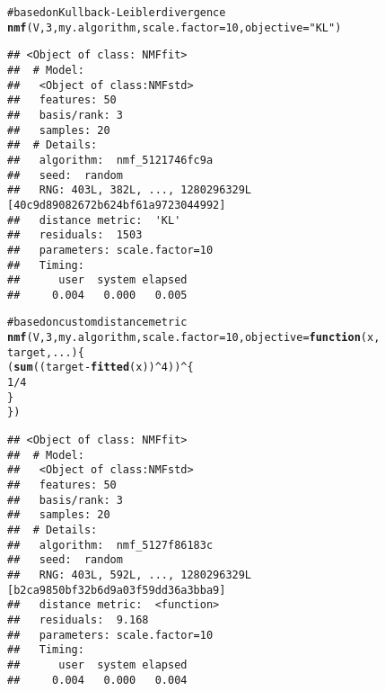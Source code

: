 \documentclass[a4paper]{article}\usepackage{graphicx, color}
\makeatletter
\newcommand{\hlfunctioncall}[1]{\textcolor[rgb]{0.501960784313725,0,0.329411764705882}{\textbf{#1}}}%
\newcommand{\hlstring}[1]{\textcolor[rgb]{0.6,0.6,1}{#1}}%
\newcommand{\hlcomment}[1]{\textcolor[rgb]{0.180392156862745,0.6,0.341176470588235}{#1}}%
\newenvironment{kframe}{%
 \def\at@end@of@kframe{}%
 \ifinner\ifhmode%
  \def\at@end@of@kframe{\end{minipage}}%
  \begin{minipage}{\columnwidth}%
 \fi\fi%
 \def\FrameCommand##1{\hskip\@totalleftmargin \hskip-\fboxsep
 \colorbox{shadecolor}{##1}\hskip-\fboxsep
     \hskip-\linewidth \hskip-\@totalleftmargin \hskip\columnwidth}%
 \MakeFramed {\advance\hsize-\width
   \@totalleftmargin\z@ \linewidth\hsize
   \@setminipage}}%
 {\par\unskip\endMakeFramed%
 \at@end@of@kframe}
\newenvironment{knitrout}{}{} %
\makeatother
\begin{document}
\begin{knitrout}
\color{fgcolor}\begin{kframe}
\begin{alltt}
\hlcomment{# based on Kullback-Leibler divergence}
\hlfunctioncall{nmf}(V, 3, my.algorithm, scale.factor = 10, objective = \hlstring{"KL"})
\end{alltt}
\begin{verbatim}
## <Object of class: NMFfit>
##  # Model:
##   <Object of class:NMFstd>
##   features: 50 
##   basis/rank: 3 
##   samples: 20 
##  # Details:
##   algorithm:  nmf_5121746fc9a 
##   seed:  random 
##   RNG: 403L, 382L, ..., 1280296329L [40c9d89082672b624bf61a9723044992]
##   distance metric:  'KL' 
##   residuals:  1503 
##   parameters: scale.factor=10 
##   Timing:
##      user  system elapsed 
##     0.004   0.000   0.005
\end{verbatim}
\begin{alltt}
\hlcomment{# based on custom distance metric}
\hlfunctioncall{nmf}(V, 3, my.algorithm, scale.factor = 10, objective = \hlfunctioncall{function}(x, 
    target, ...) \{
    (\hlfunctioncall{sum}((target - \hlfunctioncall{fitted}(x))^4))^\{
        1/4
    \}
\})
\end{alltt}
\begin{verbatim}
## <Object of class: NMFfit>
##  # Model:
##   <Object of class:NMFstd>
##   features: 50 
##   basis/rank: 3 
##   samples: 20 
##  # Details:
##   algorithm:  nmf_5127f86183c 
##   seed:  random 
##   RNG: 403L, 592L, ..., 1280296329L [b2ca9850bf32b6d9a03f59dd36a3bba9]
##   distance metric:  <function> 
##   residuals:  9.168 
##   parameters: scale.factor=10 
##   Timing:
##      user  system elapsed 
##     0.004   0.000   0.004
\end{verbatim}
\end{kframe}
\end{knitrout}


%
%
\end{document}
